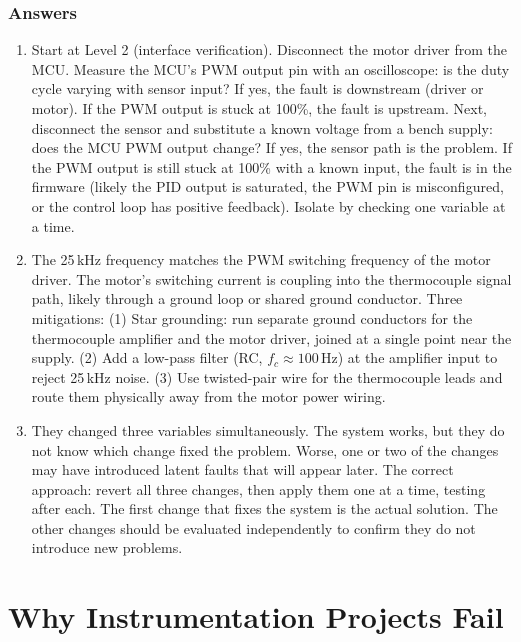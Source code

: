 \documentclass[11pt,letterpaper,twoside,openany]{book}
\begin{document}
\subsection{Answers}
\begin{enumerate}[leftmargin=1.5em]
\item Start at Level 2 (interface verification). Disconnect the motor driver from the MCU. Measure the MCU's PWM output pin with an oscilloscope: is the duty cycle varying with sensor input? If yes, the fault is downstream (driver or motor). If the PWM output is stuck at 100\%, the fault is upstream. Next, disconnect the sensor and substitute a known voltage from a bench supply: does the MCU PWM output change? If yes, the sensor path is the problem. If the PWM output is still stuck at 100\% with a known input, the fault is in the firmware (likely the PID output is saturated, the PWM pin is misconfigured, or the control loop has positive feedback). Isolate by checking one variable at a time.
\item The 25\,kHz frequency matches the PWM switching frequency of the motor driver. The motor's switching current is coupling into the thermocouple signal path, likely through a ground loop or shared ground conductor. Three mitigations: (1) Star grounding: run separate ground conductors for the thermocouple amplifier and the motor driver, joined at a single point near the supply. (2) Add a low-pass filter (RC, $f_c \approx 100$\,Hz) at the amplifier input to reject 25\,kHz noise. (3) Use twisted-pair wire for the thermocouple leads and route them physically away from the motor power wiring.
\item They changed three variables simultaneously. The system works, but they do not know which change fixed the problem. Worse, one or two of the changes may have introduced latent faults that will appear later. The correct approach: revert all three changes, then apply them one at a time, testing after each. The first change that fixes the system is the actual solution. The other changes should be evaluated independently to confirm they do not introduce new problems.
\end{enumerate}


\chapter*{Why Instrumentation Projects Fail}
\label{ch:projects_fail}
\end{document}
